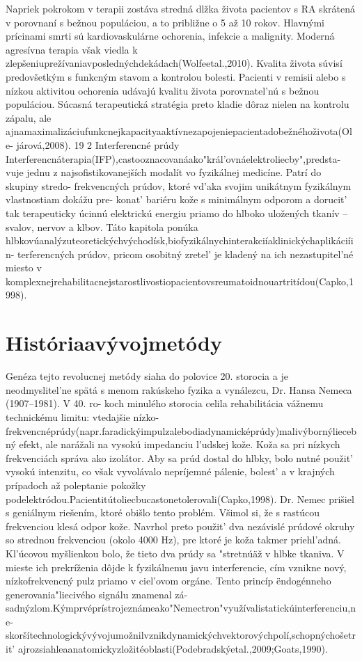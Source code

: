 Napriek pokrokom v terapii zostáva stredná dlžka života pacientov s RA skrátená v porovnaní s bežnou populáciou, a to približne o 5 až 10 rokov. Hlavnými prícinami smrti sú kardiovaskulárne ochorenia, infekcie a malignity. Moderná agresívna terapia však viedla k zlepšeniuprežívaniavposlednýchdekádach(Wolfeetal.,2010). Kvalita života súvisí predovšetkým s funkcným stavom a kontrolou bolesti. Pacienti v remisii alebo s nízkou aktivitou ochorenia udávajú kvalitu života porovnatel’nú s bežnou populáciou. Súcasná terapeutická stratégia preto kladie dôraz nielen na kontrolu zápalu, ale ajnamaximalizáciufunkcnejkapacityaaktívnezapojeniepacientadobežnéhoživota(Ole- járová,2008). 19 2 Interferencné prúdy Interferencnáterapia(IFP),castooznacovanáako"král’ovnáelektroliecby",predsta- vuje jednu z najsofistikovanejších modalít vo fyzikálnej medicíne. Patrí do skupiny stredo- frekvencných prúdov, ktoré vd’aka svojim unikátnym fyzikálnym vlastnostiam dokážu pre- konat’ bariéru kože s minimálnym odporom a dorucit’ tak terapeuticky úcinnú elektrickú energiu priamo do hlboko uložených tkanív -- svalov, nervov a klbov. Táto kapitola ponúka hlbkovúanalýzuteoretickýchvýchodísk,biofyzikálnychinterakciíaklinickýchaplikáciíin- terferencných prúdov, pricom osobitný zretel’ je kladený na ich nezastupitel’né miesto v komplexnejrehabilitacnejstarostlivostiopacientovsreumatoidnouartritídou(Capko,1998).


\section{Históriaavývojmetódy}

Genéza tejto revolucnej metódy siaha do polovice 20. storocia a je neodmyslitel’ne spätá s menom rakúskeho fyzika a vynálezcu, Dr. Hansa Nemeca (1907--1981). V 40. ro- koch minulého storocia celila rehabilitácia vážnemu technickému limitu: vtedajšie nízko- frekvencnéprúdy(napr.faradickýimpulzalebodiadynamicképrúdy)malivýbornýliecebný efekt, ale narážali na vysokú impedanciu l’udskej kože. Koža sa pri nízkych frekvenciách správa ako izolátor. Aby sa prúd dostal do hlbky, bolo nutné použit’ vysokú intenzitu, co však vyvolávalo nepríjemné pálenie, bolest’ a v krajných prípadoch až poleptanie pokožky podelektródou.Pacientitútoliecbucastonetolerovali(Capko,1998). Dr. Nemec prišiel s geniálnym riešením, ktoré obišlo tento problém. Všimol si, že s rastúcou frekvenciou klesá odpor kože. Navrhol preto použit’ dva nezávislé prúdové okruhy so strednou frekvenciou (okolo 4000 Hz), pre ktoré je koža takmer priehl’adná. Kl’úcovou myšlienkou bolo, že tieto dva prúdy sa "stretnúäž v hlbke tkaniva. V mieste ich prekríženia dôjde k fyzikálnemu javu interferencie, cím vznikne nový, nízkofrekvencný pulz priamo v ciel’ovom orgáne. Tento princíp ëndogénneho generovania"liecivého signálu znamenal zá- sadnýzlom.Kýmprvéprístrojeznámeako"Nemectron"využívalistatickúinterferenciu,ne- skoršítechnologickývývojumožnilvznikdynamickýchvektorovýchpolí,schopnýchošetrit’ ajrozsiahleaanatomickyzložitéoblasti(Podebradskýetal.,2009;Goats,1990).


